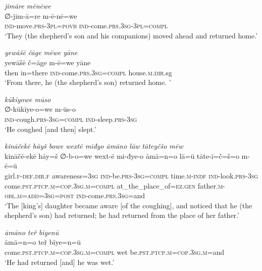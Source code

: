 \ea \label{KŠ.58}
\textit{jimāre mēnēwe} \\ 
\gll ∅-jim-ā=re m-ē-nē=we \\ 
 \textsc{ind-}move\textsc{.prs}\textsc{-3pl}\textsc{=\textsc{povb}} \textsc{ind-}come\textsc{.prs}\textsc{.3sg}\textsc{-3pl}\textsc{=compl} \\ 
\glt `They (the shepherd’s son and his companions) moved ahead and returned home.'
\z 
 
\ea \label{KŠ.60}
\textit{yewāšē čāge mēwe yāne} \\ 
\gll yewāšē č=āge m-ē=we yāne \\ 
 then in=there \textsc{ind-}come\textsc{.prs}\textsc{.3sg}\textsc{=compl} house\textsc{.m}\textsc{.dir}.sg \\ 
\glt `From there, he (the shepherd’s son) returned home. '
\z 
 
\ea \label{KŠ.64}
\textit{kūkīyowe mūso} \\ 
\gll ∅-kūkīye-o=we m-ūs-o \\ 
 \textsc{ind-}cough\textsc{.prs}\textsc{-3sg}\textsc{=compl} \textsc{ind-}sleep\textsc{.prs}\textsc{-3sg} \\ 
\glt `He coughed [and then] slept.'
\z 
 
\ea \label{KŠ.65}
\textit{kināčekē hāyš bowe wextē miđyo āmāno lāw tāteyčšo mēw} \\ 
\gll kināčē-ekē hāy=š ∅-b-o=we wext-ē mi-đye-o āmā=n=o lā=ū tāte-ī=č=š=o m-ē=ū \\ 
 girl\textsc{.f}\textsc{-def}\textsc{.dir}\textsc{.f} awareness\textsc{=3sg} \textsc{ind-}be\textsc{.prs}\textsc{-3sg}\textsc{=compl} time\textsc{.m}\textsc{-indf} \textsc{ind-}look\textsc{.prs}\textsc{-3sg} come\textsc{.pst}\textsc{.ptcp}\textsc{.m}\textsc{=cop}\textsc{.3sg}\textsc{.m}\textsc{=compl} at\_the\_place\_of\textsc{\textsc{=ez.gen}} father\textsc{.m}\textsc{-obl}\textsc{.m}\textsc{=add}\textsc{=3sg}\textsc{=\textsc{post}} \textsc{ind-}come\textsc{.prs}\textsc{.3sg}=and \\ 
\glt `The [king’s] daughter became aware [of the coughing], and noticed that he (the shepherd’s son) had returned; he had returned from the place of her father.'
\z 
 
\ea \label{KŠ.66}
\textit{āmāno teř bīyenū} \\ 
\gll āmā=n=o teř bīye=n=ū \\ 
 come\textsc{.pst}\textsc{.ptcp}\textsc{.m}\textsc{=cop}\textsc{.3sg}\textsc{.m}\textsc{=compl} wet be\textsc{.pst}\textsc{.ptcp}\textsc{.m}\textsc{=cop}\textsc{.3sg}\textsc{.m}=and \\ 
\glt `He had returned [and] he was wet.'
\z 
 
